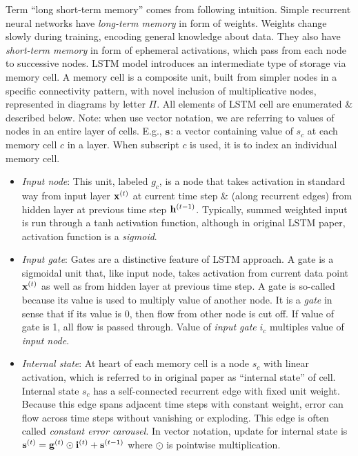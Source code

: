 \documentclass{article}
\begin{document}
\begin{enumerate}
\begin{itemize}
\begin{itemize}
			Term ``long short-term memory'' comes from following intuition. Simple recurrent neural networks have {\it long-term memory} in form of weights. Weights change slowly during training, encoding general knowledge about data. They also have {\it short-term memory} in form of ephemeral activations, which pass from each node to successive nodes. LSTM model introduces an intermediate type of storage via memory cell. A memory cell is a composite unit, built from simpler nodes in a specific connectivity pattern, with novel inclusion of multiplicative nodes, represented in diagrams by letter $\Pi$. All elements of LSTM cell are enumerated \& described below. Note: when use vector notation, we are referring to values of nodes in an entire layer of cells. E.g., ${\bf s}$: a vector containing value of $s_c$ at each memory cell $c$ in a layer. When subscript $c$ is used, it is to index an individual memory cell.
			\begin{itemize}
				\item {\it Input node}: This unit, labeled $g_c$, is a node that takes activation in standard way from input layer ${\bf x}^{(t)}$ at current time step \& (along recurrent edges) from hidden layer at previous time step ${\bf h}^{(t - 1)}$. Typically, summed weighted input is run through a tanh activation function, although in original LSTM paper, activation function is a {\it sigmoid}.
				\item {\it Input gate}: Gates are a distinctive feature of LSTM approach. A gate is a sigmoidal unit that, like input node, takes activation from current data point ${\bf x}^{(t)}$ as well as from hidden layer at previous time step. A gate is so-called because its value is used to multiply value of another node. It is a {\it gate} in sense that if its value is 0, then flow from other node is cut off. If value of gate is 1, all flow is passed through. Value of {\it input gate} $i_c$ multiples value of {\it input node}.
				\item {\it Internal state}: At heart of each memory cell is a node $s_c$ with linear activation, which is referred to in original paper as ``internal state'' of cell. Internal state $s_c$ has a self-connected recurrent edge with fixed unit weight. Because this edge spans adjacent time steps with constant weight, error can flow across time steps without vanishing or exploding. This edge is often called {\it constant error carousel}. In vector notation, update for internal state is ${\bf s}^{(t)} = {\bf g}^{(t)}\odot{\bf i}^{(t)} + {\bf s}^{(t - 1)}$ where $\odot$ is pointwise multiplication.

\end{itemize}
\end{itemize}
\end{itemize}
\end{enumerate}
\end{document}
